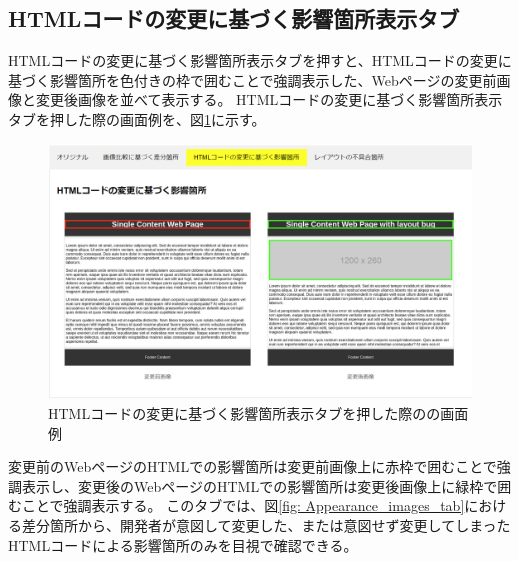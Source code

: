 \subsection{HTMLコードの変更に基づく影響箇所表示タブ}\label{subsec:html_tab}
HTMLコードの変更に基づく影響箇所表示タブを押すと、HTMLコードの変更に基づく影響箇所を色付きの枠で囲むことで強調表示した、Webページの変更前画像と変更後画像を並べて表示する。
HTMLコードの変更に基づく影響箇所表示タブを押した際の画面例を、図\ref{fig: Appearance_html_tab}に示す。
\begin{figure}[tp]
    \begin{center}
        \includegraphics[width=1.0\columnwidth]{image/3_html_tab2.png}
        \caption{HTMLコードの変更に基づく影響箇所表示タブを押した際の\toolName の画面例}
        \label{fig: Appearance_html_tab}
    \end{center}
\end{figure}
変更前のWebページのHTMLでの影響箇所は変更前画像上に赤枠で囲むことで強調表示し、変更後のWebページのHTMLでの影響箇所は変更後画像上に緑枠で囲むことで強調表示する。
このタブでは、図\ref{fig: Appearance_images_tab}における差分箇所から、開発者が意図して変更した、または意図せず変更してしまったHTMLコードによる影響箇所のみを目視で確認できる。

